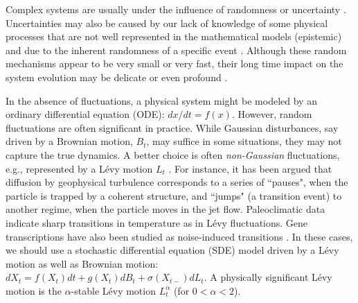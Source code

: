 \documentclass[11pt]{NSFamsart}
\begin{document}
Complex systems are usually under the influence of randomness or uncertainty \cite{Moss1, Horst, Gar, VanKampen3}. Uncertainties may also be caused by our lack of knowledge of some physical processes that are not well represented in the mathematical models (epistemic) and due to the inherent randomness of a specific event  \cite{Palmer1, Kantz, Wilks, Williams}.
Although these random mechanisms appear to be very small or very fast, their long time impact on the system evolution may be delicate or even profound \cite{Arnold, DuanBook2015}. 


In the absence of fluctuations, a physical system might be modeled by an  ordinary differential equation (ODE): $ dx/dt=f(x)$.  However, random fluctuations are often significant in practice. While Gaussian disturbances, say driven by a  Brownian motion, $B_t$, may suffice in some situations, they may not capture the true dynamics.  A better choice is often \emph{non-Gaussian} fluctuations, e.g., represented by a L\'evy motion $L_t$ \cite{Woy,Dit, Shlesinger,taqqu,dybiec2009levy}. For instance, it has been argued that diffusion by geophysical turbulence \cite{Shlesinger}
corresponds  to a series of  ``pauses", when the
particle is trapped by a coherent structure, and  
``jumps" (a transition event) to another regime, when the particle moves in the jet
flow. Paleoclimatic data \cite{Dit, ZhengYY2020}   indicate   sharp transitions in temperature as in L\'evy fluctuations. Gene transcriptions have also been studied as noise-induced transitions \cite{Raser2005,Suel06,Lin2016GeneED, ChenWuDuan}. 
In these cases, we should use a
 stochastic   differential equation (SDE)  model \cite{Arnold,   Oksendal, DuanBook2015, Applebaum}
 driven by a L\'evy motion as well as Brownian motion:
 $
 dX_t= f(X_t) dt + g(X_t) dB_t + \sigma(X_{t-}) dL_t.
 $
 A physically significant L\'evy motion is the  $\alpha$-stable L\'evy motion $L_t^\alpha$ (for $0<\alpha<2$).  
 
\end{document}

